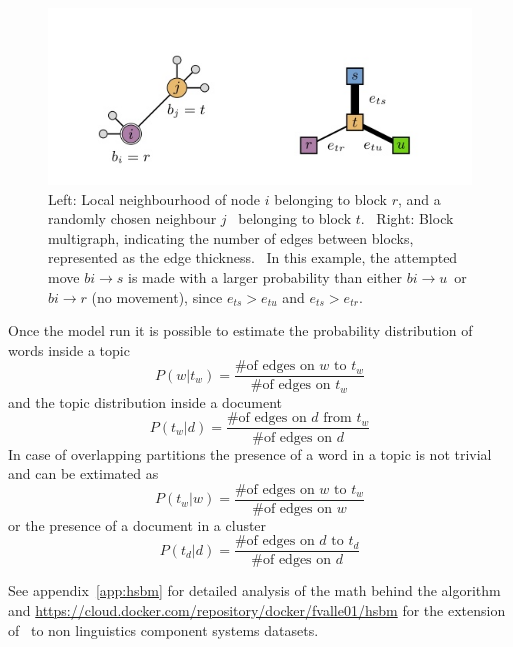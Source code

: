 \begin{figure}[htb!]
  \centering
  \includegraphics[width=0.9\linewidth]{pictures/topic/peixioto_move.jpg}
  \caption{Left: Local neighbourhood of node $i$ belonging to block $r$, and a randomly chosen neighbour $j$ \
  belonging to block $t$. \
  Right: Block multigraph, indicating the number of edges between blocks, represented as the edge thickness. \
  In this example, the attempted move $bi \to s$ is made with a larger probability than either $bi \to u$\
   or $bi \to r$ (no movement), since $e_{ts}>e_{tu}$ and $e_{ts}>e_{tr}$.}
  \label{fig:topic_pixioto_move}
\end{figure}

Once the model run it is possible to estimate the probability distribution of words inside a topic
\[P(w|t_w)=\frac{\text{\# of edges on $w$ to $t_w$}}{\text{\# of edges on $t_w$}}\]
and the topic distribution inside a document
\[P(t_w|d)=\frac{\text{\# of edges on $d$ from $t_w$}}{\text{\# of edges on $d$}}\]
In case of overlapping partitions the presence of a word in a topic is not trivial and can be extimated as 
\[P(t_w|w)=\frac{\text{\# of edges on $w$ to $t_w$}}{\text{\# of edges on $w$}}\]
or the presence of a document in a cluster
\[P(t_d|d)=\frac{\text{\# of edges on $d$ to $t_d$}}{\text{\# of edges on $d$}}\]

See appendix~\ref{app:hsbm} for detailed analysis of the math behind the algorithm and \url{https://cloud.docker.com/repository/docker/fvalle01/hsbm} for the extension of~\cite{gerlach2018network} to non linguistics component systems datasets.